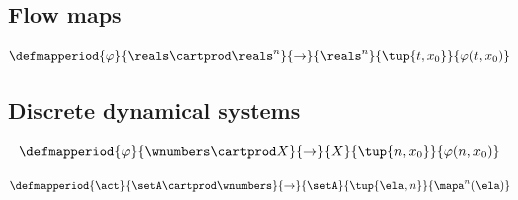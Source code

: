 \subsection{Flow maps}

\begin{equation}
\defmapperiod{
         \varphi
        }{
           \reals \cartprod \reals^n
        }{
           \to
        }{
           \reals^n 
        }{
          \tup{t, x_0}
        }{
           \varphi(t, x_0)
           }
\end{equation}

\subsection{Discrete dynamical systems}




\begin{equation}
\defmapperiod{
         \varphi
        }{
           \wnumbers \cartprod X
        }{
           \to
        }{
           X 
        }{
          \tup{n, x_0}
        }{
           \varphi(n, x_0)
           }
\end{equation}


\begin{equation}
\defmapperiod{
         \act
        }{
           \setA \cartprod \wnumbers
        }{
           \to
        }{
           \setA
        }{
          \tup{\ela, n}
        }{
          \mapa^n(\ela)
           }
\end{equation}





